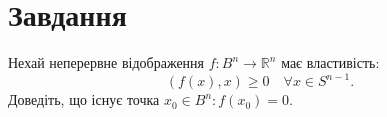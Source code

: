 
\chapter{Завдання \theHchapter}

\begin{tcolorbox}[title=Завдання]
    Нехай неперервне відображення $f: B^{n} \rightarrow \mathbb{R}^{n}$ має властивість:
    $$(f(x), x) \geq 0 \quad \forall x \in S^{n-1} .$$
    Доведіть, що існує точка $x_{0} \in B^{n}: f\left(x_{0}\right)=0$.

\end{tcolorbox}



